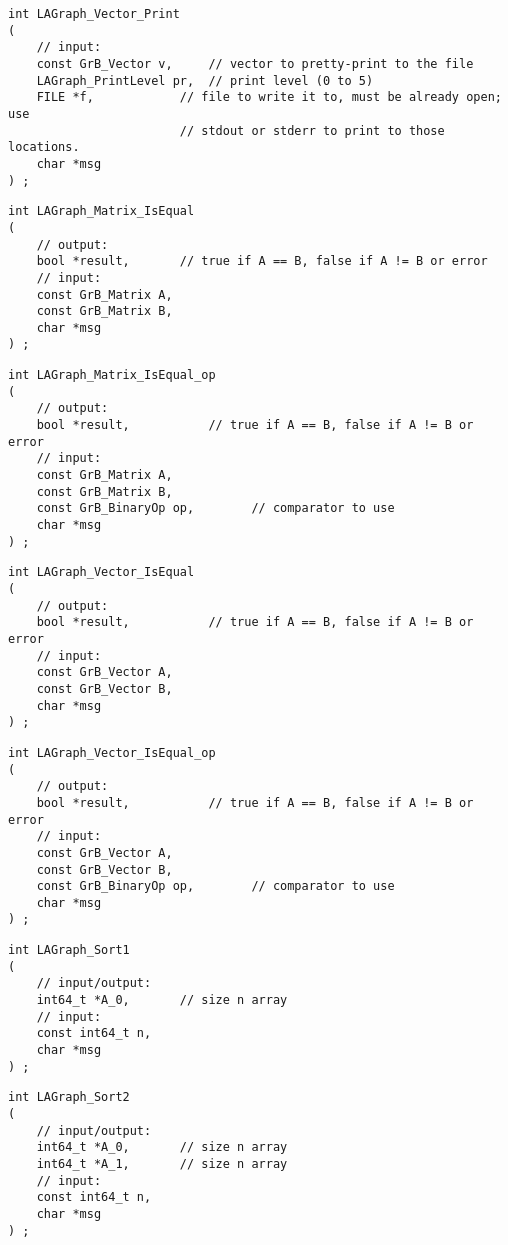 \begin{verbatim}
int LAGraph_Vector_Print
(
    // input:
    const GrB_Vector v,     // vector to pretty-print to the file
    LAGraph_PrintLevel pr,  // print level (0 to 5)
    FILE *f,            // file to write it to, must be already open; use
                        // stdout or stderr to print to those locations.
    char *msg
) ;
\end{verbatim}




\begin{verbatim}
int LAGraph_Matrix_IsEqual
(
    // output:
    bool *result,       // true if A == B, false if A != B or error
    // input:
    const GrB_Matrix A,
    const GrB_Matrix B,
    char *msg
) ;
\end{verbatim}




\begin{verbatim}
int LAGraph_Matrix_IsEqual_op
(
    // output:
    bool *result,           // true if A == B, false if A != B or error
    // input:
    const GrB_Matrix A,
    const GrB_Matrix B,
    const GrB_BinaryOp op,        // comparator to use
    char *msg
) ;
\end{verbatim}




\begin{verbatim}
int LAGraph_Vector_IsEqual
(
    // output:
    bool *result,           // true if A == B, false if A != B or error
    // input:
    const GrB_Vector A,
    const GrB_Vector B,
    char *msg
) ;
\end{verbatim}




\begin{verbatim}
int LAGraph_Vector_IsEqual_op
(
    // output:
    bool *result,           // true if A == B, false if A != B or error
    // input:
    const GrB_Vector A,
    const GrB_Vector B,
    const GrB_BinaryOp op,        // comparator to use
    char *msg
) ;
\end{verbatim}




\begin{verbatim}
int LAGraph_Sort1
(
    // input/output:
    int64_t *A_0,       // size n array
    // input:
    const int64_t n,
    char *msg
) ;
\end{verbatim}




\begin{verbatim}
int LAGraph_Sort2
(
    // input/output:
    int64_t *A_0,       // size n array
    int64_t *A_1,       // size n array
    // input:
    const int64_t n,
    char *msg
) ;
\end{verbatim}




